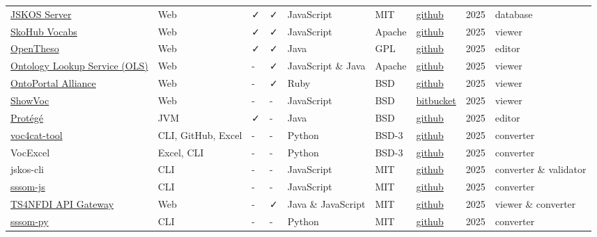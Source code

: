 \documentclass[
  DIV=10]{article}
\begin{document}
\begin{longtable}[]{@{}lllllllll@{}}
\href{https://github.com/gbv/jskos-server}{JSKOS Server} & Web & ✓ & ✓ &
JavaScript & MIT & \href{https://github.com/gbv/jskos-server}{github} &
2025 & database \\
\href{https://github.com/skohub-io/skohub-vocabs}{SkoHub Vocabs} & Web &
✓ & ✓ & JavaScript & Apache &
\href{https://github.com/skohub-io/skohub-vocabs}{github} & 2025 &
viewer \\
\href{https://opentheso.hypotheses.org/}{OpenTheso} & Web & ✓ & ✓ & Java
& GPL & \href{https://github.com/miledrousset/Opentheso}{github} & 2025
& editor \\
\href{https://github.com/EBISPOT/ols4}{Ontology Lookup Service (OLS)} &
Web & - & ✓ & JavaScript \& Java & Apache &
\href{https://github.com/EBISPOT/OLS}{github} & 2025 & viewer \\
\href{https://ontoportal.org/}{OntoPortal Alliance} & Web & - & ✓ & Ruby
& BSD & \href{https://github.com/ontoportal}{github} & 2025 & viewer \\
\href{https://showvoc.uniroma2.it/}{ShowVoc} & Web & - & - & JavaScript
& BSD &
\href{https://bitbucket.org/art-uniroma2/showvoc/src/master/}{bitbucket}
& 2025 & viewer \\
\href{https://protege.stanford.edu/}{Protégé} & JVM & ✓ & - & Java & BSD
& \href{https://github.com/protegeproject/protege}{github} & 2025 &
editor \\
\href{https://github.com/nfdi4cat/voc4cat-tool/}{voc4cat-tool} & CLI,
GitHub, Excel & - & - & Python & BSD-3 &
\href{https://github.com/nfdi4cat/voc4cat-tool/}{github} & 2025 &
converter \\
VocExcel & Excel, CLI & - & - & Python & BSD-3 &
\href{https://github.com/Kurrawong/VocExcel}{github} & 2025 &
converter \\
jskos-cli & CLI & - & - & JavaScript & MIT &
\href{https://github.com/gbv/jskos-cli/}{github} & 2025 & converter \&
validator \\
\href{https://www.npmjs.org/package/sssom}{sssom-js} & CLI & - & - &
JavaScript & MIT & \href{https://github.com/gbv/sssom-js}{github} & 2025
& converter \\
\href{https://ts4nfdi.github.io/api-gateway/}{TS4NFDI API Gateway} & Web
& - & ✓ & Java \& JavaScript & MIT &
\href{https://github.com/ts4nfdi/api-gateway}{github} & 2025 & viewer \&
converter \\
\href{https://mapping-commons.github.io/sssom-py}{sssom-py} & CLI & - &
- & Python & MIT &
\href{https://github.com/mapping-commons/sssom-py}{github} & 2025 &
converter \\

\end{longtable}
\end{document}
